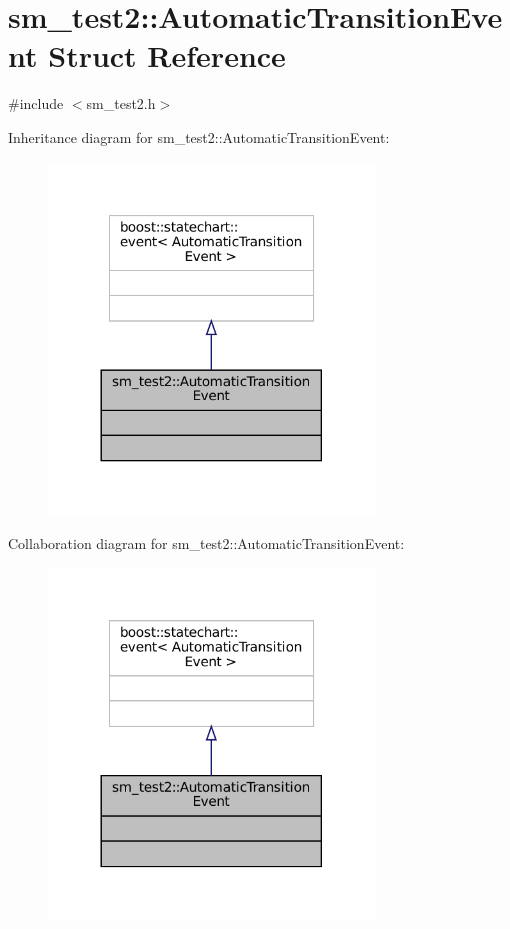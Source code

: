 \hypertarget{structsm__test2_1_1AutomaticTransitionEvent}{}\section{sm\+\_\+test2\+:\+:Automatic\+Transition\+Event Struct Reference}
\label{structsm__test2_1_1AutomaticTransitionEvent}


{\ttfamily \#include $<$sm\+\_\+test2.\+h$>$}



Inheritance diagram for sm\+\_\+test2\+:\+:Automatic\+Transition\+Event\+:
\nopagebreak
\begin{figure}[H]
\begin{center}
\leavevmode
\includegraphics[width=245pt]{structsm__test2_1_1AutomaticTransitionEvent__inherit__graph}
\end{center}
\end{figure}


Collaboration diagram for sm\+\_\+test2\+:\+:Automatic\+Transition\+Event\+:
\nopagebreak
\begin{figure}[H]
\begin{center}
\leavevmode
\includegraphics[width=245pt]{structsm__test2_1_1AutomaticTransitionEvent__coll__graph}
\end{center}
\end{figure}


